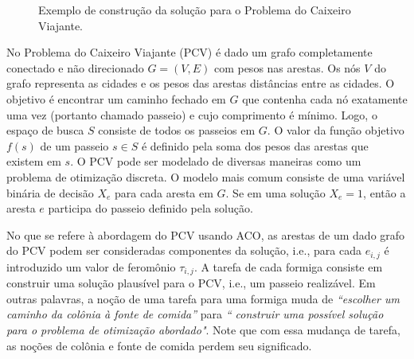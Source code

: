 \begin{figure}[ht]
  \caption{Exemplo de construção da solução para o Problema do Caixeiro Viajante.}
  \label{img:exemp_aco}
\end{figure}

No Problema do Caixeiro Viajante (PCV) é dado um grafo completamente conectado e
não direcionado $G = (V , E)$ com pesos nas arestas.
Os nós $V$ do grafo representa as cidades e os pesos das arestas
distâncias entre as cidades. O objetivo é encontrar um caminho fechado em $G$
que contenha cada nó exatamente uma vez (portanto chamado passeio)
e cujo comprimento é mínimo. Logo, o espaço de busca $S$ consiste de todos os
passeios em $G$. O valor da função objetivo $f(s)$ de um passeio $s \in S$ 
é definido pela soma dos pesos das arestas que existem em $s$. O PCV pode ser
modelado de diversas maneiras como um problema de otimização discreta.
O modelo mais comum consiste de uma variável binária de decisão $X_e$ para
cada aresta em $G$.
Se em uma solução $X_e = 1$, então a aresta $e$ participa do passeio definido pela solução.

No que se refere à abordagem do PCV usando ACO,
as arestas de um dado grafo do PCV podem ser consideradas componentes da solução,
i.e., para cada $e_{i,j}$ é introduzido um valor de feromônio $\tau_{i,j}$. 
A tarefa de cada formiga consiste em construir uma solução plausível para o PCV, i.e.,
um passeio realizável. Em outras palavras, a noção de uma tarefa para uma formiga
muda de \textit{“escolher um caminho da colônia à fonte de comida”} para \textit{“
construir uma possível solução para o problema de otimização abordado"}. Note que com essa
mudança de tarefa, as noções de colônia e fonte de comida perdem seu significado.

